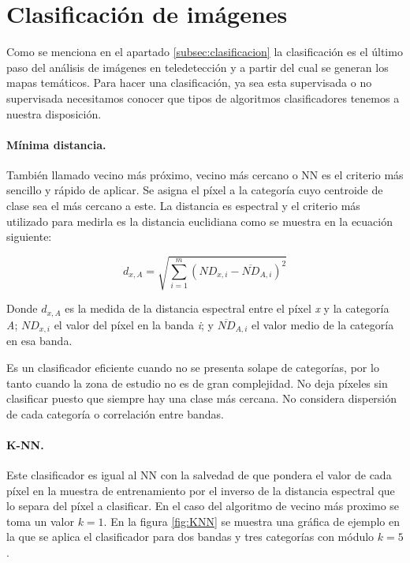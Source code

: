\section{Clasificación de imágenes}
Como se menciona en el apartado \ref{subsec:clasificacion} la clasificación es el último paso del análisis de imágenes en teledetección y a partir del cual se generan los mapas temáticos. Para hacer una clasificación, ya sea esta supervisada o no supervisada necesitamos conocer que tipos de algoritmos clasificadores tenemos a nuestra disposición.

\paragraph{Mínima distancia.}
También llamado vecino más próximo, vecino más cercano o \ac{NN} es el criterio más sencillo y rápido de aplicar. Se asigna el píxel a la categoría cuyo centroide de clase sea el más cercano a este.  La distancia es espectral y el criterio más utilizado para medirla es la distancia euclidiana como se muestra en la ecuación siguiente:

\begin{equation}
d_{x,A}=\sqrt{\displaystyle\sum_{i=1}^{m}(ND_{x,i}-\overline{ND}_{A,i})^{2}}
\end{equation}\Sep

Donde $d_{x,A}$ es la medida de la distancia espectral entre el píxel \textit{x} y la categoría \textit{A}; $ND_{x,i}$ el valor del píxel en la banda \textit{i}; y $\overline{ND}_{A,i}$ el valor medio de la categoría en esa banda.\Sep

Es un clasificador eficiente cuando no se presenta solape de categorías, por lo tanto cuando la zona de estudio no es de gran complejidad. No deja píxeles sin clasificar puesto que siempre hay una clase más cercana. No considera dispersión de cada categoría o correlación entre bandas.

\paragraph{\ac{K-NN}.}
Este clasificador es igual al \ac{NN} con la salvedad de que pondera el valor de cada píxel en la muestra de entrenamiento por el inverso de la distancia espectral que lo separa del píxel a clasificar. En el caso del algoritmo de vecino más proximo se toma un valor $k=1$. En la figura \ref{fig:KNN} se muestra una gráfica de ejemplo en la que se aplica el clasificador para dos bandas y tres categorías con módulo $k=5$.

